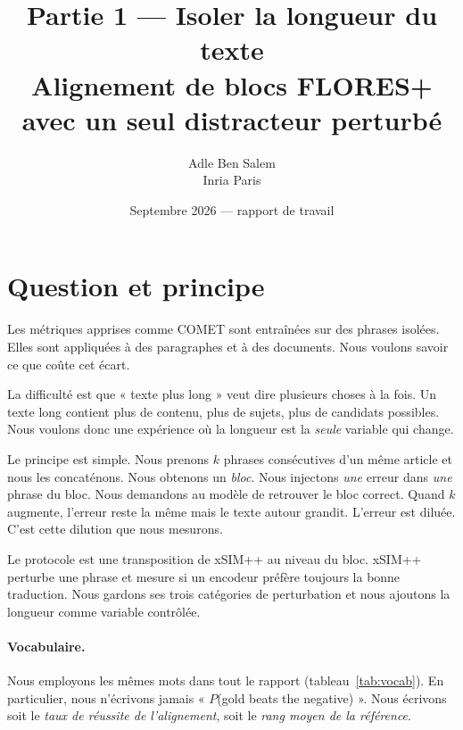 \documentclass[11pt]{article}
\title{Partie 1 --- Isoler la longueur du texte\\
\large Alignement de blocs FLORES+ avec un seul distracteur perturbé}
\author{Adle Ben Salem \\ \small Inria Paris}
\date{Septembre 2026 --- rapport de travail}
\begin{document}
\maketitle

\section{Question et principe}

Les métriques apprises comme COMET sont entraînées sur des phrases isolées.
Elles sont appliquées à des paragraphes et à des documents.
Nous voulons savoir ce que coûte cet écart.

La difficulté est que « texte plus long » veut dire plusieurs choses à la fois.
Un texte long contient plus de contenu, plus de sujets, plus de candidats possibles.
Nous voulons donc une expérience où la longueur est la \emph{seule} variable qui change.

Le principe est simple.
Nous prenons $k$ phrases consécutives d'un même article et nous les concaténons.
Nous obtenons un \emph{bloc}.
Nous injectons \emph{une} erreur dans \emph{une} phrase du bloc.
Nous demandons au modèle de retrouver le bloc correct.
Quand $k$ augmente, l'erreur reste la même mais le texte autour grandit.
L'erreur est diluée.
C'est cette dilution que nous mesurons.

Le protocole est une transposition de xSIM++ \citep{chen2023xsimpp} au niveau du bloc.
xSIM++ perturbe une phrase et mesure si un encodeur préfère toujours la bonne traduction.
Nous gardons ses trois catégories de perturbation et nous ajoutons la longueur comme variable contrôlée.

\paragraph{Vocabulaire.}
Nous employons les mêmes mots dans tout le rapport (tableau~\ref{tab:vocab}).
En particulier, nous n'écrivons jamais « $P$(gold beats the negative) ».
Nous écrivons soit le \emph{taux de réussite de l'alignement}, soit le \emph{rang moyen de la référence}.
\end{document}
